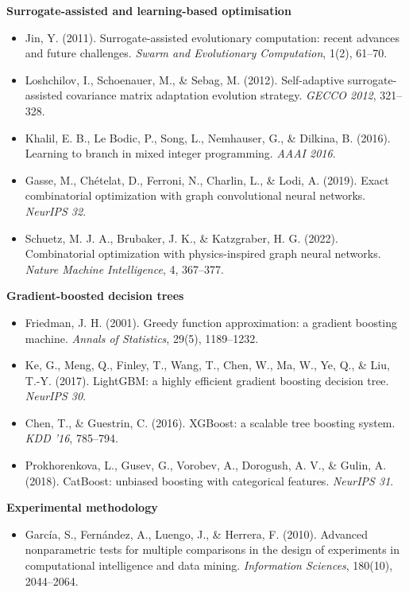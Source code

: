 \documentclass[
  11pt,
]{article}
\providecommand{\tightlist}{%
  \setlength{\itemsep}{0pt}\setlength{\parskip}{0pt}}
\begin{document}
\textbf{Surrogate-assisted and learning-based optimisation}

\begin{itemize}
\tightlist
\item
  Jin, Y. (2011). Surrogate-assisted evolutionary computation: recent
  advances and future challenges. \emph{Swarm and Evolutionary
  Computation}, 1(2), 61--70.
\item
  Loshchilov, I., Schoenauer, M., \& Sebag, M. (2012). Self-adaptive
  surrogate-assisted covariance matrix adaptation evolution strategy.
  \emph{GECCO 2012}, 321--328.
\item
  Khalil, E. B., Le Bodic, P., Song, L., Nemhauser, G., \& Dilkina, B.
  (2016). Learning to branch in mixed integer programming. \emph{AAAI
  2016}.
\item
  Gasse, M., Chételat, D., Ferroni, N., Charlin, L., \& Lodi, A. (2019).
  Exact combinatorial optimization with graph convolutional neural
  networks. \emph{NeurIPS 32}.
\item
  Schuetz, M. J. A., Brubaker, J. K., \& Katzgraber, H. G. (2022).
  Combinatorial optimization with physics-inspired graph neural
  networks. \emph{Nature Machine Intelligence}, 4, 367--377.
\end{itemize}

\textbf{Gradient-boosted decision trees}

\begin{itemize}
\tightlist
\item
  Friedman, J. H. (2001). Greedy function approximation: a gradient
  boosting machine. \emph{Annals of Statistics}, 29(5), 1189--1232.
\item
  Ke, G., Meng, Q., Finley, T., Wang, T., Chen, W., Ma, W., Ye, Q., \&
  Liu, T.-Y. (2017). LightGBM: a highly efficient gradient boosting
  decision tree. \emph{NeurIPS 30}.
\item
  Chen, T., \& Guestrin, C. (2016). XGBoost: a scalable tree boosting
  system. \emph{KDD '16}, 785--794.
\item
  Prokhorenkova, L., Gusev, G., Vorobev, A., Dorogush, A. V., \& Gulin,
  A. (2018). CatBoost: unbiased boosting with categorical features.
  \emph{NeurIPS 31}.
\end{itemize}

\textbf{Experimental methodology}

\begin{itemize}
\tightlist
\item
  García, S., Fernández, A., Luengo, J., \& Herrera, F. (2010). Advanced
  nonparametric tests for multiple comparisons in the design of
  experiments in computational intelligence and data mining.
  \emph{Information Sciences}, 180(10), 2044--2064.
\end{itemize}
\end{document}
